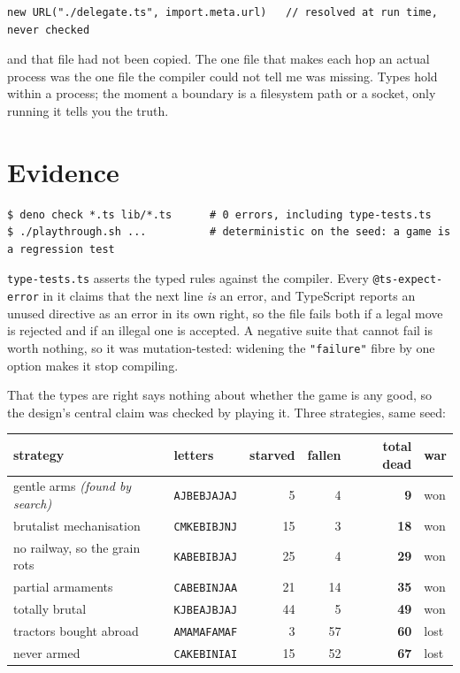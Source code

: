 \documentclass[11pt,a4paper]{article}
\begin{document}
\begin{lstlisting}[language=TS]
new URL("./delegate.ts", import.meta.url)   // resolved at run time, never checked
\end{lstlisting}

\noindent and that file had not been copied. The
one file that makes each hop an actual process was the one file the compiler
could not tell me was missing. Types hold within a process; the moment a
boundary is a filesystem path or a socket, only running it tells you the truth.

\section{Evidence}

\begin{lstlisting}[style=trace]
$ deno check *.ts lib/*.ts      # 0 errors, including type-tests.ts
$ ./playthrough.sh ...          # deterministic on the seed: a game is a regression test
\end{lstlisting}

\noindent \verb|type-tests.ts| asserts the typed rules against the compiler.
Every \verb|@ts-expect-error| in it claims that the next line \emph{is} an
error, and TypeScript reports an unused directive as an error in its own right,
so the file fails both if a legal move is rejected and if an illegal one is
accepted. A negative suite that cannot fail is worth nothing, so it was
mutation-tested: widening the \verb|"failure"| fibre by one option makes it
stop compiling.

That the types are right says nothing about whether the game is any good, so
the design's central claim was checked by playing it. Three strategies, same
seed:

\begin{center}
\begin{tabular}{llrrrl}
\toprule
strategy & letters & starved & fallen & total dead & war \\
\midrule
gentle arms \emph{(found by search)} & \texttt{AJBEBJAJAJ} & 5 & 4 & \textbf{9} & won \\
brutalist mechanisation & \texttt{CMKEBIBJNJ} & 15 & 3 & \textbf{18} & won \\
no railway, so the grain rots & \texttt{KABEBIBJAJ} & 25 & 4 & \textbf{29} & won \\
partial armaments & \texttt{CABEBINJAA} & 21 & 14 & \textbf{35} & won \\
totally brutal & \texttt{KJBEAJBJAJ} & 44 & 5 & \textbf{49} & won \\
tractors bought abroad & \texttt{AMAMAFAMAF} & 3 & 57 & \textbf{60} & lost \\
never armed & \texttt{CAKEBINIAI} & 15 & 52 & \textbf{67} & lost \\
\bottomrule
\end{tabular}
\end{center}
\end{document}
